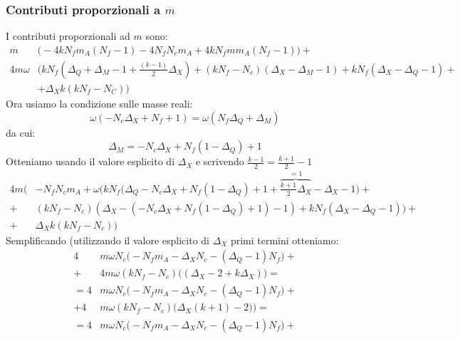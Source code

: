 \documentclass[a4paper,12pt]{article}
\begin{document}
\subsubsection{Contributi proporzionali a $m$}
I contributi proporzionali ad $m$ sono:
\begin{align*}
 m  &\bigg( - 4 k N_f m_A ( N_f -1) - 4 N_f N_c m_A   + 4 k N_f m m_A (N_f -1)\bigg)  + \\
  4 m \omega &  \bigg(   k N_f( \Delta_Q + \Delta_M -1 + \frac{(k-1)}{2} \Delta_X )  + (k N_f -N_c) ( \Delta_X - \Delta_M - 1) + k N_f ( \Delta_X - \Delta_Q -1) + \\ 
  & +  \Delta_X  k ( k N_f - N_C) \bigg)
 \end{align*}
Ora usiamo la condizione sulle masse reali:
\begin{equation}
	\omega ( - N_c \Delta_X + N_f + 1  ) = \omega ( N_f \Delta_Q + \Delta_M)
\end{equation}
da cui:
\begin{equation}
	\Delta_M = -N_c \Delta_X + N_f ( 1 - \Delta_Q) + 1 
\end{equation}
Otteniamo usando il valore esplicito di $\Delta_X$ e scrivendo $ \frac{k-1}{2} = \frac{k+1}{2} - 1$
\begin{align*}
  4m \bigg(& -   N_f N_c m_A  +   \omega \big( k N_f ( \Delta_Q - N_c \Delta_X + N_f ( 1 - \Delta_Q)+ 1 + \overbrace{\frac{k+1}{2}\Delta_X}^{=1} - \Delta_X  -1 \big)  + \\
+& (k N_f -N_c) ( \Delta_X -( - N_c \Delta_X + N_f( 1-\Delta_Q) +1) - 1) +  k N_f (  \Delta_X -\Delta_Q - 1) \big)+ \\
+ &  \Delta_X  k ( k N_f - N_c)  \bigg) 
\end{align*}
Semplificando (utilizzando il valore esplicito di $\Delta_X$ primi termini otteniamo:
\begin{align*}
 4 & m \omega N_c \bigg(   -   N_f  m_A 
 -\Delta_{X} N_{c} - {\left(\Delta_{Q} - 1\right)} N_{f} \bigg) + \\
 + & 4 m \omega (k N_f - N_c) \bigg(
(\Delta_X - 2 + k \Delta_X )   \bigg)  = \\
= 4 & m \omega N_c \bigg(    -   N_f  m_A  
 -\Delta_{X} N_{c} - {\left(\Delta_{Q} - 1\right)} N_{f} \bigg) + \\
 + 4 & m \omega ( k N_f - N_c) \bigg( \Delta_X ( k+1) -2 ) \bigg) = \\
 = 4 & m \omega N_c \bigg(    -   N_f  m_A 
 -\Delta_{X} N_{c} - {\left(\Delta_{Q} - 1\right)} N_{f} \bigg) + \\
\end{align*}
\end{document}
